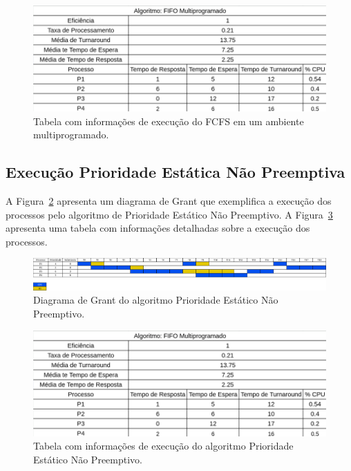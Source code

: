 \documentclass[
	12pt,				%
	oneside,   	        %
	a4paper,			%
	english,			%
	french,				%
	spanish,			%
	brazil,				%
	]{pacotes/abntex2}
\begin{document}
\begin{figure}[H]
  \centering
  \includegraphics[scale=0.5]{figuras/ex3/tabela/fifo_multi.png}
  \caption{Tabela com informações de execução do FCFS em um ambiente multiprogramado.}
  \label{fig:ex3/tabela/fcfs_multi}
\end{figure}

\subsection{Execução Prioridade Estática Não Preemptiva}
\label{subsubsec:prio_sem_preemp}

A Figura~\ref{fig:ex3/diagrama/prio_sem_preemp} apresenta um diagrama de Grant que exemplifica a execução dos processos pelo algoritmo de Prioridade Estático Não Preemptivo. A Figura~\ref{fig:ex3/tabela/prio_sem_preemp} apresenta uma tabela com informações detalhadas sobre a execução dos processos.

\begin{figure}[H]
  \centering
  \includegraphics[scale=0.20]{figuras/ex3/diagrama/prio_sem_preemp.png}
  \caption{Diagrama de Grant do algoritmo Prioridade Estático Não Preemptivo.}
  \label{fig:ex3/diagrama/prio_sem_preemp}
\end{figure}

\begin{figure}[H]
  \centering
  \includegraphics[scale=0.5]{figuras/ex3/tabela/fifo_multi.png}
  \caption{Tabela com informações de execução do algoritmo Prioridade Estático Não Preemptivo.}
  \label{fig:ex3/tabela/prio_sem_preemp}
\end{figure}
\end{document}
